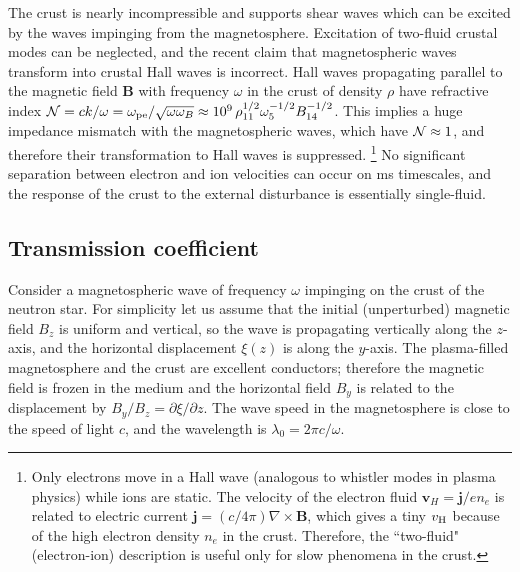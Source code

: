 The crust is nearly incompressible and supports shear waves which can be excited by the \alfven waves impinging from the magnetosphere. 
Excitation of two-fluid crustal modes can be neglected, and the recent claim that magnetospheric \alfven waves  transform into crustal Hall waves \citep{2015MNRAS.447.1407L} is incorrect.
Hall waves propagating parallel to the magnetic field ${\mathbf B}$ with frequency $\omega$ in the crust of density $\rho$ have refractive index 
${\cal N}=ck/\omega=\omega_{\mathrm{pe}}/\sqrt{\omega\omega_B}
\approx 10^{9}\, \rho_{11}^{1/2} \omega_5^{-1/2} B_{14}^{-1/2}$. 
This implies a huge impedance mismatch with the magnetospheric \alfven waves, which have ${\cal N}\approx 1$, and therefore their transformation to Hall waves is suppressed.
\footnote{Only electrons move in a Hall wave (analogous to whistler modes in plasma physics) while ions are static.
The velocity of the electron fluid $\mathbf{v}_H=\mathbf{j}/en_e$ is related to electric current $\mathbf{j}=(c/4\pi)\nabla\times {\mathbf B}$, which gives a tiny $v_{\rm H}$ because of the high electron density $n_e$ in the crust. 
Therefore, the ``two-fluid"(electron-ion) description is useful only for slow phenomena in the crust.}
No significant separation between electron and ion velocities can occur on ms timescales, and the response of the crust to the external disturbance is essentially single-fluid.
     
\subsection{Transmission coefficient}

Consider a magnetospheric \alfven wave of frequency $\omega$ impinging on the crust of the neutron star. For simplicity let us assume that the initial (unperturbed) magnetic field $B_z$ is uniform and vertical, so the wave is propagating vertically along the $z$-axis, and the horizontal displacement $\xi(z)$ is along the $y$-axis. 
The plasma-filled magnetosphere and the crust are excellent conductors; therefore the magnetic field is frozen in the medium and the horizontal field $B_y$ is related to the displacement by $B_y/B_z=\partial\xi/\partial z$.
The wave speed in the magnetosphere is close to the speed of light $c$, and the wavelength is $\lambda_0=2\pi c/\omega$. 

